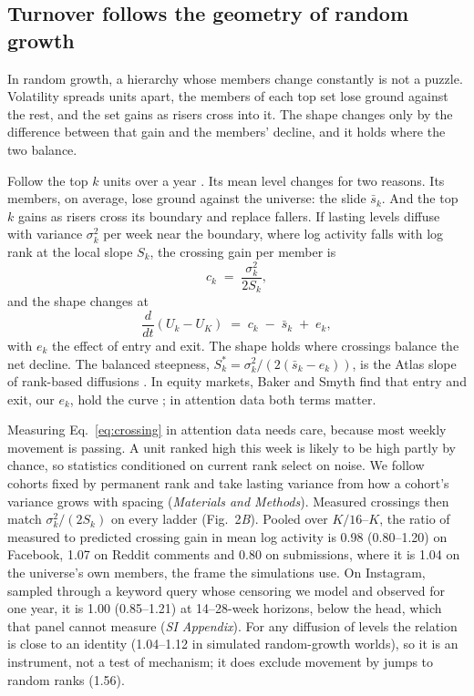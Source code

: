 \documentclass[9pt,twocolumn,twoside]{pnas-new}
\begin{document}
\subsection*{Turnover follows the geometry of random growth}
In random growth, a hierarchy whose members change constantly is not a puzzle. Volatility spreads units apart, the members of each top set lose ground against the rest, and the set gains as risers cross into it. The shape changes only by the difference between that gain and the members' decline, and it holds where the two balance.

Follow the top $k$ units over a year \cite{gomez2023}. Its mean level changes for two reasons. Its members, on average, lose ground against the universe: the slide $\bar s_k$. And the top $k$ gains as risers cross its boundary and replace fallers. If lasting levels diffuse with variance $\sigma_k^2$ per week near the boundary, where log activity falls with log rank at the local slope $S_k$, the crossing gain per member is
\begin{equation}
c_k \;=\; \frac{\sigma_k^2}{2S_k},
\label{eq:crossing}
\end{equation}
and the shape changes at
\begin{equation}
\frac{d}{dt}\left(U_k - U_K\right) \;=\; c_k \;-\; \bar s_k \;+\; e_k ,
\label{eq:rate}
\end{equation}
with $e_k$ the effect of entry and exit. The shape holds where crossings balance the net decline. The balanced steepness, $S^\ast_k = \sigma_k^2/(2(\bar s_k - e_k))$, is the Atlas slope of rank-based diffusions \cite{banner2005,fernholzfernholz2020}. In equity markets, Baker and Smyth find that entry and exit, our $e_k$, hold the curve \cite{bakersmyth2026}; in attention data both terms matter.

Measuring Eq.~\ref{eq:crossing} in attention data needs care, because most weekly movement is passing. A unit ranked high this week is likely to be high partly by chance, so statistics conditioned on current rank select on noise. We follow cohorts fixed by permanent rank and take lasting variance from how a cohort's variance grows with spacing (\textit{Materials and Methods}). Measured crossings then match $\sigma_k^2/(2S_k)$ on every ladder (Fig.~2\textit{B}). Pooled over $K/16$--$K$, the ratio of measured to predicted crossing gain in mean log activity is 0.98 (0.80--1.20) on Facebook, 1.07 on Reddit comments and 0.80 on submissions, where it is 1.04 on the universe's own members, the frame the simulations use. On Instagram, sampled through a keyword query whose censoring we model and observed for one year, it is 1.00 (0.85--1.21) at 14--28-week horizons, below the head, which that panel cannot measure (\textit{SI Appendix}). For any diffusion of levels the relation is close to an identity (1.04--1.12 in simulated random-growth worlds), so it is an instrument, not a test of mechanism; it does exclude movement by jumps to random ranks (1.56).
\end{document}
